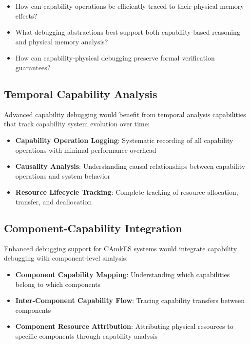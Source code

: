 \documentclass[11pt,a4paper]{article}
\begin{document}
\begin{subsubsection}
\begin{itemize}
\item How can capability operations be efficiently traced to their physical memory effects?
\item What debugging abstractions best support both capability-based reasoning and physical memory analysis?
\item How can capability-physical debugging preserve formal verification guarantees?
\end{itemize}

\subsection{Temporal Capability Analysis}

Advanced capability debugging would benefit from temporal analysis capabilities that track capability system evolution over time:

\begin{itemize}
\item \textbf{Capability Operation Logging}: Systematic recording of all capability operations with minimal performance overhead
\item \textbf{Causality Analysis}: Understanding causal relationships between capability operations and system behavior
\item \textbf{Resource Lifecycle Tracking}: Complete tracking of resource allocation, transfer, and deallocation
\end{itemize}

\subsection{Component-Capability Integration}

Enhanced debugging support for CAmkES systems would integrate capability debugging with component-level analysis:

\begin{itemize}
\item \textbf{Component Capability Mapping}: Understanding which capabilities belong to which components
\item \textbf{Inter-Component Capability Flow}: Tracing capability transfers between components
\item \textbf{Component Resource Attribution}: Attributing physical resources to specific components through capability analysis
\end{itemize}


\end{subsubsection}
\end{document}
